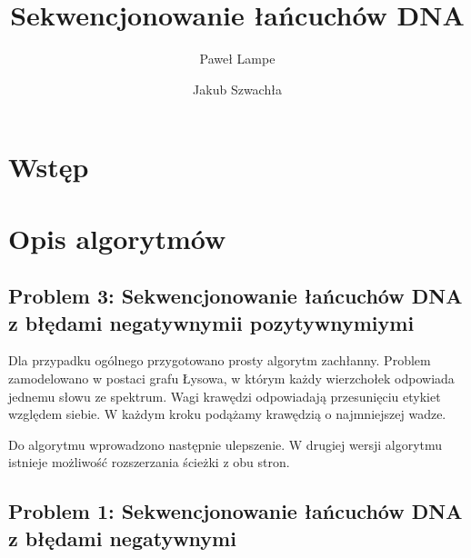 \documentclass[a4paper]{article}
\title{Sekwencjonowanie łańcuchów DNA}
\date
\author{Paweł Lampe \and Jakub Szwachła}
\begin{document}
\maketitle

\section{Wstęp}

\section{Opis algorytmów}

\subsection{Problem 3: Sekwencjonowanie łańcuchów DNA z błędami
negatywnymii pozytywnymiymi}

Dla przypadku ogólnego przygotowano prosty algorytm zachłanny. Problem
zamodelowano w postaci grafu Łysowa, w którym każdy wierzchołek
odpowiada jednemu słowu ze spektrum. Wagi krawędzi odpowiadają
przesunięciu etykiet względem siebie. W każdym kroku podążamy krawędzią
o najmniejszej wadze.

Do algorytmu wprowadzono następnie ulepszenie. W drugiej wersji
algorytmu istnieje możliwość rozszerzania ścieżki z obu stron.


\subsection{Problem 1: Sekwencjonowanie łańcuchów DNA z błędami
negatywnymi}
\end{document}
